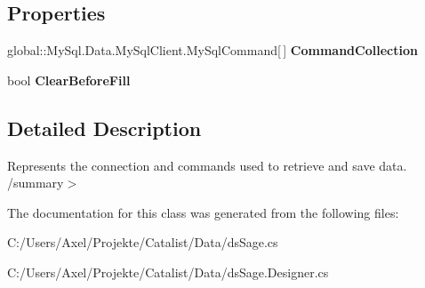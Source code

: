 \subsection*{Properties}
\begin{DoxyCompactItemize}
\item 
global\+::\+My\+Sql.\+Data.\+My\+Sql\+Client.\+My\+Sql\+Command\mbox{[}$\,$\mbox{]} {\bfseries Command\+Collection}\hypertarget{class_products_1_1_data_1_1ds_sage_table_adapters_1_1ta_suchkunde_af01ca02c17c809b744e4cea46d5d0975}{}\label{class_products_1_1_data_1_1ds_sage_table_adapters_1_1ta_suchkunde_af01ca02c17c809b744e4cea46d5d0975}

\item 
bool {\bfseries Clear\+Before\+Fill}\hypertarget{class_products_1_1_data_1_1ds_sage_table_adapters_1_1ta_suchkunde_a788a09b1a2237fd5a07e88fd3618f466}{}\label{class_products_1_1_data_1_1ds_sage_table_adapters_1_1ta_suchkunde_a788a09b1a2237fd5a07e88fd3618f466}

\end{DoxyCompactItemize}


\subsection{Detailed Description}
Represents the connection and commands used to retrieve and save data. /summary$>$ 

The documentation for this class was generated from the following files\+:\begin{DoxyCompactItemize}
\item 
C\+:/\+Users/\+Axel/\+Projekte/\+Catalist/\+Data/ds\+Sage.\+cs\item 
C\+:/\+Users/\+Axel/\+Projekte/\+Catalist/\+Data/ds\+Sage.\+Designer.\+cs\end{DoxyCompactItemize}
